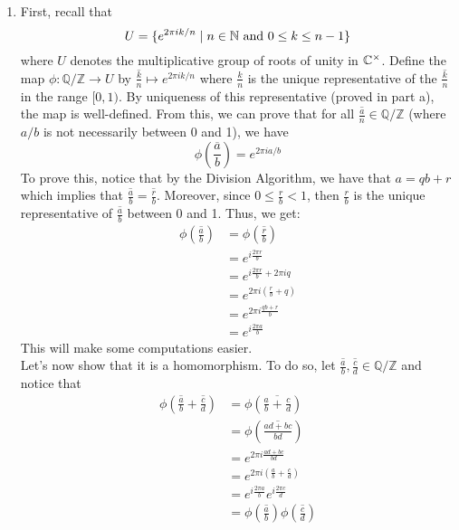 \begin{solution}
\begin{enumerate}[label = \textbf{(\alph*)}]
        \item First, recall that 
        $$U = \{e^{2\pi i k / n} \mathrel{|} n \in \mathbb{N} \text{ and } 0 \leq k \leq n-1\}$$
        where $U$ denotes the multiplicative group of roots of unity in $\mathbb{C}^{\times}$. Define the map $\phi : \mathbb{Q/Z} \to U$ by $\overline{\frac{k}{n}} \mapsto e^{2\pi i k / n}$ where $\frac{k}{n}$ is the unique representative of the $\overline{\frac{k}{n}}$ in the range $[0,1)$. By uniqueness of this representative (proved in part a), the map is well-defined. From this, we can prove that for all $\overline{\frac{a}{n}} \in \mathbb{Q/Z}$ (where $a/b$ is not necessarily between 0 and 1), we have
        $$\phi\left(\overline{\frac{a}{b}}\right) = e^{2\pi i a / b}$$
        To prove this, notice that by the Division Algorithm, we have that $a = qb + r$ which implies that $\overline{\frac{a}{b}} = \overline{\frac{r}{b}}$. Moreover, since $0 \leq \frac{r}{b} < 1$, then $\frac{r}{b}$ is the unique representative of $\overline{\frac{a}{b}}$ between 0 and 1. Thus, we get:
        \begin{align*}
            \phi\left(\overline{\frac{a}{b}}\right) &= \phi\left(\overline{\frac{r}{b}}\right) \\
            &= e^{i\frac{2\pi r}{b}} \\
            &= e^{i\frac{2\pi r}{b} + 2\pi i q} \\
            &= e^{2\pi i \left(\frac{r}{b} + q\right)} \\
            &= e^{2\pi i \frac{qb + r}{b}} \\
            &= e^{i\frac{2\pi a}{b}}
        \end{align*}
        This will make some computations easier. \\
        Let's now show that it is a homomorphism. To do so, let $\overline{\frac{a}{b}}, \overline{\frac{c}{d}} \in \mathbb{Q/Z}$ and notice that
        \begin{align*}
            \phi\left(\overline{\frac{a}{b}} + \overline{\frac{c}{d}}\right) &= \phi\left(\overline{\frac{a}{b}+ \frac{c}{d}}\right) \\
            &= \phi\left(\overline{\frac{ad + bc}{bd}}\right) \\
            &= e^{2\pi i\frac{ad+bc}{bd}} \\
            &= e^{2\pi i\left(\frac{a}{b}+\frac{c}{d}\right)} \\
            &= e^{i\frac{2\pi a}{b}} e^{i\frac{2\pi c}{d}}\\
            &= \phi\left(\overline{\frac{a}{b}}\right)\phi\left(\overline{\frac{c}{d}}\right)

\end{align*}
\end{enumerate}
\end{solution}
